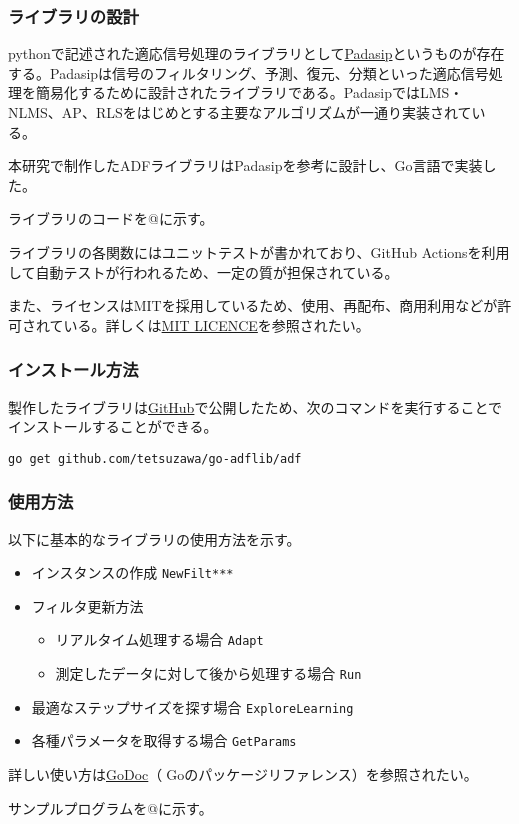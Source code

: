 \hypertarget{ux30e9ux30a4ux30d6ux30e9ux30eaux306eux8a2dux8a08}{%
\subsubsection{ライブラリの設計}\label{ux30e9ux30a4ux30d6ux30e9ux30eaux306eux8a2dux8a08}}

pythonで記述された適応信号処理のライブラリとして\href{https://matousc89.github.io/padasip/index.html\#padasip}{Padasip}というものが存在する。Padasipは信号のフィルタリング、予測、復元、分類といった適応信号処理を簡易化するために設計されたライブラリである。PadasipではLMS・NLMS、AP、RLSをはじめとする主要なアルゴリズムが一通り実装されている。

本研究で制作したADFライブラリはPadasipを参考に設計し、Go言語で実装した。

ライブラリのコードを@に示す。

ライブラリの各関数にはユニットテストが書かれており、GitHub
Actionsを利用して自動テストが行われるため、一定の質が担保されている。

また、ライセンスはMITを採用しているため、使用、再配布、商用利用などが許可されている。詳しくは\href{https://raw.githubusercontent.com/tetsuzawa/go-adflib/master/LICENSE}{MIT
LICENCE}を参照されたい。

\hypertarget{ux30a4ux30f3ux30b9ux30c8ux30fcux30ebux65b9ux6cd5}{%
\subsubsection{インストール方法}\label{ux30a4ux30f3ux30b9ux30c8ux30fcux30ebux65b9ux6cd5}}

製作したライブラリは\href{https://github.com/tetsuzawa/go-adflib}{GitHub}で公開したため、次のコマンドを実行することでインストールすることができる。

\texttt{go\ get\ github.com/tetsuzawa/go-adflib/adf}

\hypertarget{ux4f7fux7528ux65b9ux6cd5}{%
\subsubsection{使用方法}\label{ux4f7fux7528ux65b9ux6cd5}}

以下に基本的なライブラリの使用方法を示す。

\begin{itemize}
\tightlist
\item
  インスタンスの作成 \texttt{NewFilt***}
\item
  フィルタ更新方法

  \begin{itemize}
  \tightlist
  \item
    リアルタイム処理する場合 \texttt{Adapt}
  \item
    測定したデータに対して後から処理する場合 \texttt{Run}
  \end{itemize}
\item
  最適なステップサイズを探す場合 \texttt{ExploreLearning}
\item
  各種パラメータを取得する場合 \texttt{GetParams}
\end{itemize}

詳しい使い方は\href{https://godoc.org/github.com/tetsuzawa/go-adflib}{GoDoc}（Goのパッケージリファレンス）を参照されたい。

サンプルプログラムを@に示す。
